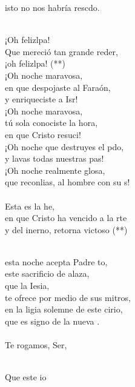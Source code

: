 \begin{cancion}
	isto no nos habría rescdo.\\\jump\\
	\begin{chorus}%
	¡Oh felizlpa!\\
	Que mereció tan grande reder,\\
	¡oh felizlpa! (**)\\
	¡Oh noche maravosa,\\
en que despojaste al Faraón,\\
	y enriqueciste a Isr!\\
	¡Oh noche maravosa,\\
tú sola conociste la hora,\\
	en que Cristo resuci!\\
	¡Oh noche que destruyes el pdo,\\
	y lavas todas nuestras pas!\\
	¡Oh noche realmente glosa,\\
	que reconlias, al hombre con su s!\\
\jump\\
	Esta es la he,\\
	en que Cristo ha vencido a la rte\\
	y del inerno, retorna victoso (**)\\
	\end{chorus}%
	\jump\\
	esta noche acepta Padre to,\\
	este sacrificio de alaza,\\
	que la Iesia,\\
	te ofrece por medio de sus mitros,\\
	en la ligia solemne de este cirio,\\
	que es signo de la nueva .\\
\jump\\
	Te rogamos, Ser,\\\jump\\
	\begin{chorus}%
	Que este io\\

\end{chorus}
\end{cancion}
